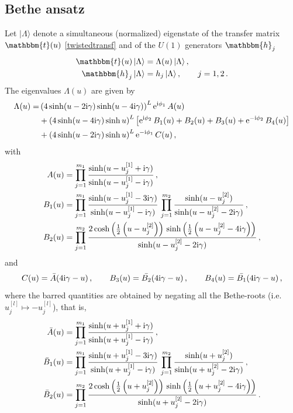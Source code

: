 \documentclass[12pt]{article}
\numberwithin{equation}{section}
\newcommand{\ri}{{\rm i}}
\newcommand{\re}{{\rm e}}
\begin{document}
\subsection{Bethe ansatz}


Let $|\Lambda\rangle$ denote a simultaneous (normalized) eigenstate of the transfer matrix
$\mathbbm{t}(u)$ \eqref{twistedtransf}
and of the $U(1)$ generators $\mathbbm{h}_j$
\begin{align}
    \mathbbm{t}(u)\, |\Lambda\rangle & = \Lambda(u)\,  |\Lambda\rangle \,, \label{simult1} \\
   \mathbbm{h}_j\, |\Lambda\rangle & = h_j\,  |\Lambda\rangle \,, \qquad j = 1, 2\,.
   \label{simult2}
\end{align}
The eigenvalues $\Lambda(u)$ are given by
\begin{align}
\Lambda(u) =& \left(4\sinh(u-2\ri \gamma)\sinh(u-4\ri \gamma)\right)^{L} \re^{\ri \phi_1}\, A(u) \nonumber \\
 &+ \left(4 \sinh(u-4\ri \gamma) \sinh u\right)^L \left[ \re^{\ri \phi_2}\, B_1(u) + B_2(u) + B_3(u) + \re^{-\ri \phi_2}\, B_4(u) \right] \nonumber\\
&+ \left(4\sinh(u-2\ri \gamma)\sinh u\right)^{L} \re^{-\ri \phi_1}\, C(u) \,,
\label{TQtwist}
\end{align}
with 
\begin{equation}
    \label{AB1B2}
\begin{aligned}
    A(u) &= \prod_{j=1}^{m_1} \frac{\sinh(u-u^{[1]}_j+\ri \gamma)}{\sinh(u-u^{[1]}_j-\ri \gamma)}\,,\\
    B_1(u) &= \prod_{j=1}^{m_1}
      \frac{\sinh(u-u^{[1]}_j-3\ri \gamma)}{\sinh(u-u^{[1]}_j-\ri \gamma)}\,
      \prod_{j=1}^{m_2}\frac{\sinh(u-u^{[2]}_j)}{\sinh(u-u^{[2]}_j-2\ri \gamma)}\,, \\
          B_2(u) &      = \prod_{j=1}^{m_2} \frac{2\cosh\left(\frac{1}{2}\left(u-u^{[2]}_j\right)\right)\,\sinh\left(\frac{1}{2}\left(u-u^{[2]}_j-4\ri \gamma\right)\right)}{\sinh(u-u^{[2]}_j-2\ri \gamma)}\,,
\end{aligned}
\end{equation}
and
\begin{equation}
    C(u)=\bar{A}(4\ri \gamma-u)\,, \qquad
    B_3(u)=\bar{B_2}(4\ri \gamma-u)\,, \qquad
    B_4(u)=\bar{B_1}(4\ri \gamma-u)\,, 
\label{CB3B4}
\end{equation}
where the barred quantities are obtained by negating all the Bethe-roots (i.e. $u^{[l]}_j \mapsto -u^{[l]}_j$), that is,
\begin{equation}
    \begin{aligned}
    \bar{A}(u) &= \prod_{j=1}^{m_1} \frac{\sinh(u+u^{[1]}_j+\ri \gamma)}{\sinh(u+u^{[1]}_j-\ri \gamma)}\,,\\
    \bar{B}_1(u) &= \prod_{j=1}^{m_1}
      \frac{\sinh(u+u^{[1]}_j-3\ri \gamma)}{\sinh(u+u^{[1]}_j-\ri \gamma)}\,
      \prod_{j=1}^{m_2}\frac{\sinh(u+u^{[2]}_j)}{\sinh(u+u^{[2]}_j-2\ri \gamma)}\,, \\
          \bar{B}_2(u) &      = \prod_{j=1}^{m_2} \frac{2\cosh\left(\frac{1}{2}\left(u+u^{[2]}_j\right)\right)\,\sinh\left(\frac{1}{2}\left(u+u^{[2]}_j-4\ri \gamma\right)\right)}{\sinh(u+u^{[2]}_j-2\ri \gamma)}\,.
    \end{aligned}
\end{equation}
\end{document}
